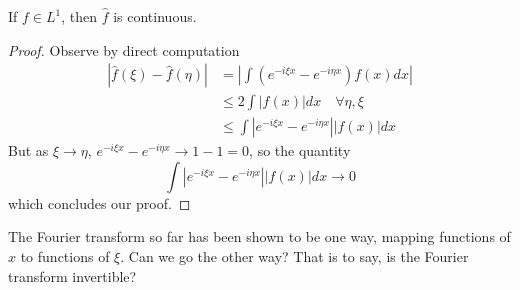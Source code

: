 
\begin{lem}
If $f\in L^{1}$, then $\widehat{f}$ is continuous.
\end{lem}
\begin{proof}
Observe by direct computation
\begin{align*}
|\widehat{f}(\xi)-\widehat{f}(\eta)| &=
\left|\int\left(e^{-i\xi x}-e^{-i\eta
  x}\right)f(x)dx\right|\\
&\leq 2\int|f(x)|dx\quad\forall\eta,\xi\\
&\leq \int\left|e^{-i\xi x}-e^{-i\eta x}\right||f(x)|dx
\end{align*}
But as $\xi\to\eta$, $e^{-i\xi x}-e^{-i\eta x}\to 1-1=0$, so
the quantity
\begin{equation}
\int\left|e^{-i\xi x}-e^{-i\eta x}\right||f(x)|dx\to 0
\end{equation}
which concludes our proof.
\end{proof}
The Fourier transform so far has been shown to be one way,
mapping functions of $x$ to functions of $\xi$. Can we go
the other way? That is to say, is the Fourier transform
invertible?

